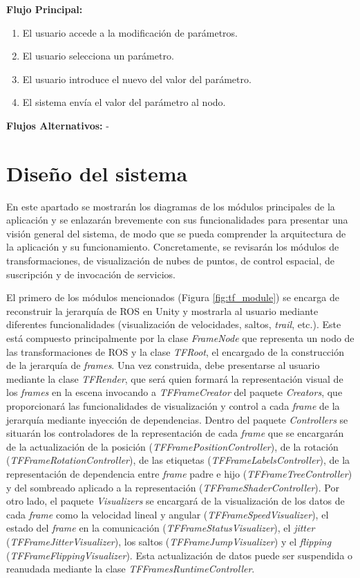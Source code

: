 \textbf{Flujo Principal:}
\begin{enumerate}
    \item El usuario accede a la modificación de parámetros.  
    \item El usuario selecciona un parámetro.
    \item El usuario introduce el nuevo del valor del parámetro.
    \item El sistema envía el valor del parámetro al nodo.
\end{enumerate}

\textbf{Flujos Alternativos:}
-


\section{Diseño del sistema}
En este apartado se mostrarán los diagramas de los módulos principales de la aplicación y se enlazarán brevemente con sus funcionalidades para 
presentar una visión general del sistema, de modo que se pueda comprender la arquitectura de la aplicación y su funcionamiento.
Concretamente, se revisarán los módulos de transformaciones, de visualización de nubes de puntos, de control espacial,
de suscripción y de invocación de servicios.

El primero de los módulos mencionados (Figura \ref{fig:tf_module}) se encarga de reconstruir la jerarquía 
de ROS en Unity y mostrarla al usuario mediante diferentes funcionalidades (visualización de velocidades,
saltos, \textit{trail}, etc.). 
Este está compuesto principalmente por la clase \textit{FrameNode} que representa un nodo de las transformaciones 
de ROS y la clase \textit{TFRoot}, el encargado de la construcción de la jerarquía de \textit{frames}. 
Una vez construida, debe presentarse al usuario mediante la clase \textit{TFRender}, que será 
quien formará la representación visual de los \textit{frames} en la escena invocando a \textit{TFFrameCreator} del paquete \textit{Creators},
que proporcionará las funcionalidades de visualización y control a cada \textit{frame} de la jerarquía mediante inyección de dependencias.
Dentro del paquete \textit{Controllers} se situarán los controladores de la representación de cada \textit{frame} que se 
encargarán de la actualización de la posición (\textit{TFFramePositionController}), 
de la rotación (\textit{TFFrameRotationController}), de las etiquetas (\textit{TFFrameLabelsController}),
de la representación de dependencia entre \textit{frame} padre e hijo (\textit{TFFrameTreeController}) y 
del sombreado aplicado a la representación (\textit{TFFrameShaderController}).
Por otro lado, el paquete \textit{Visualizers} se encargará de la visualización de los datos de cada \textit{frame} 
como la velocidad lineal y angular (\textit{TFFrameSpeedVisualizer}), el estado del \textit{frame} en la comunicación (\textit{TFFrameStatusVisualizer}),
el \textit{jitter} (\textit{TFFrameJitterVisualizer}), los saltos (\textit{TFFrameJumpVisualizer}) y el \textit{flipping} (\textit{TFFrameFlippingVisualizer}).
Esta actualización de datos puede ser suspendida o reanudada mediante la clase \textit{TFFramesRuntimeController}.

